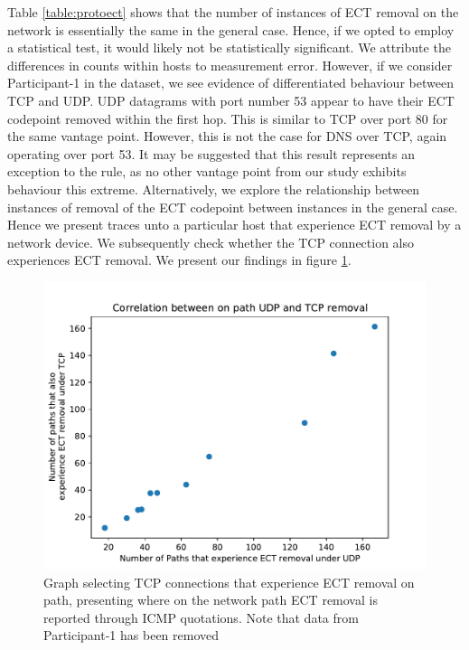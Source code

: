 \documentclass{l4proj}
\begin{document}
Table \ref{table:protoect} shows that the number of instances of ECT removal on the network is essentially the same in the general case. Hence, if we opted to employ a statistical test, it would likely not be statistically significant. We attribute the differences in counts within hosts to measurement error. However, if we consider Participant-1 in the dataset, we see evidence of differentiated behaviour between TCP and UDP. UDP datagrams with port number 53 appear to have their ECT codepoint removed within the first hop. This is similar to TCP over port 80 for the same vantage point. However, this is not the case for DNS over TCP, again operating over port 53. It may be suggested that this result represents an exception to the rule, as no other vantage point from our study exhibits behaviour this extreme. Alternatively, we explore the relationship between instances of removal of the ECT codepoint between instances in the general case. Hence we present traces unto a particular host that experience ECT removal by a network device. We subsequently check whether the TCP connection also experiences ECT removal. We present our findings in figure \ref{fig:tcpremove}.

\begin{figure}[H]
    \centering
    \includegraphics[scale=0.70]{dissertation/images/tcpudp.pdf}
    \caption{Graph selecting TCP connections that experience ECT removal on path, presenting where on the network path ECT removal is reported through ICMP quotations. Note that data from Participant-1 has been removed}
    \label{fig:tcpremove}
\end{figure}
\end{document}
